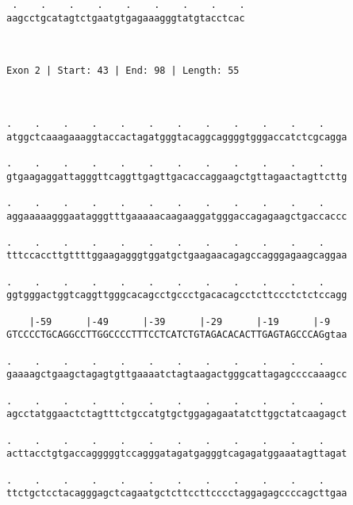 \documentclass{article}
\begin{document}
\begin{Verbatim}
 .    .    .    .    .    .    .    .    .
aagcctgcatagtctgaatgtgagaaagggtatgtacctcac
                                          
                                          
 
Exon 2 | Start: 43 | End: 98 | Length: 55



.    .    .    .    .    .    .    .    .    .    .    .    
atggctcaaagaaaggtaccactagatgggtacaggcaggggtgggaccatctcgcagga
                                                            
.    .    .    .    .    .    .    .    .    .    .    .    
gtgaagaggattagggttcaggttgagttgacaccaggaagctgttagaactagttcttg
                                                            
.    .    .    .    .    .    .    .    .    .    .    .    
aggaaaaagggaatagggtttgaaaaacaagaaggatgggaccagagaagctgaccaccc
                                                            
.    .    .    .    .    .    .    .    .    .    .    .    
tttccaccttgttttggaagagggtggatgctgaagaacagagccagggagaagcaggaa
                                                            
.    .    .    .    .    .    .    .    .    .    .    .    
ggtgggactggtcaggttgggcacagcctgccctgacacagcctcttccctctctccagg
                                                            
    |-59      |-49      |-39      |-29      |-19      |-9   
GTCCCCTGCAGGCCTTGGCCCCTTTCCTCATCTGTAGACACACTTGAGTAGCCCAGgtaa
                                                            
.    .    .    .    .    .    .    .    .    .    .    .    
gaaaagctgaagctagagtgttgaaaatctagtaagactgggcattagagccccaaagcc
                                                            
.    .    .    .    .    .    .    .    .    .    .    .    
agcctatggaactctagtttctgccatgtgctggagagaatatcttggctatcaagagct
                                                            
.    .    .    .    .    .    .    .    .    .    .    .    
acttacctgtgaccagggggtccagggatagatgagggtcagagatggaaatagttagat
                                                            
.    .    .    .    .    .    .    .    .    .    .    .    
ttctgctcctacagggagctcagaatgctcttccttcccctaggagagccccagcttgaa
                                                            

\end{Verbatim}
\end{document}
